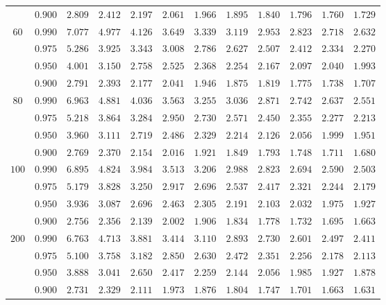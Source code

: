 \documentclass[11pt]{article}
\theoremstyle{definition}
\begin{document}
\begin{table}[H]
\begin{tabularx}{\linewidth}{c | c | c c c c c c c c c c}
		& $0.900$ & $2.809$ & $2.412$ & $2.197$ & $2.061$ & $1.966$ & $1.895$ & $1.840$ & $1.796$ & $1.760$ & $1.729$ \\
		$60$ & $0.990$ & $7.077$ & $4.977$ & $4.126$ & $3.649$ & $3.339$ & $3.119$ & $2.953$ & $2.823$ & $2.718$ & $2.632$ \\
		& $0.975$ & $5.286$ & $3.925$ & $3.343$ & $3.008$ & $2.786$ & $2.627$ & $2.507$ & $2.412$ & $2.334$ & $2.270$ \\
		& $0.950$ & $4.001$ & $3.150$ & $2.758$ & $2.525$ & $2.368$ & $2.254$ & $2.167$ & $2.097$ & $2.040$ & $1.993$ \\
		& $0.900$ & $2.791$ & $2.393$ & $2.177$ & $2.041$ & $1.946$ & $1.875$ & $1.819$ & $1.775$ & $1.738$ & $1.707$ \\
		$80$ & $0.990$ & $6.963$ & $4.881$ & $4.036$ & $3.563$ & $3.255$ & $3.036$ & $2.871$ & $2.742$ & $2.637$ & $2.551$ \\
		& $0.975$ & $5.218$ & $3.864$ & $3.284$ & $2.950$ & $2.730$ & $2.571$ & $2.450$ & $2.355$ & $2.277$ & $2.213$ \\
		& $0.950$ & $3.960$ & $3.111$ & $2.719$ & $2.486$ & $2.329$ & $2.214$ & $2.126$ & $2.056$ & $1.999$ & $1.951$ \\
		& $0.900$ & $2.769$ & $2.370$ & $2.154$ & $2.016$ & $1.921$ & $1.849$ & $1.793$ & $1.748$ & $1.711$ & $1.680$ \\
		$100$ & $0.990$ & $6.895$ & $4.824$ & $3.984$ & $3.513$ & $3.206$ & $2.988$ & $2.823$ & $2.694$ & $2.590$ & $2.503$ \\
		& $0.975$ & $5.179$ & $3.828$ & $3.250$ & $2.917$ & $2.696$ & $2.537$ & $2.417$ & $2.321$ & $2.244$ & $2.179$ \\
		& $0.950$ & $3.936$ & $3.087$ & $2.696$ & $2.463$ & $2.305$ & $2.191$ & $2.103$ & $2.032$ & $1.975$ & $1.927$ \\
		& $0.900$ & $2.756$ & $2.356$ & $2.139$ & $2.002$ & $1.906$ & $1.834$ & $1.778$ & $1.732$ & $1.695$ & $1.663$ \\
		$200$ & $0.990$ & $6.763$ & $4.713$ & $3.881$ & $3.414$ & $3.110$ & $2.893$ & $2.730$ & $2.601$ & $2.497$ & $2.411$ \\
		& $0.975$ & $5.100$ & $3.758$ & $3.182$ & $2.850$ & $2.630$ & $2.472$ & $2.351$ & $2.256$ & $2.178$ & $2.113$ \\
		& $0.950$ & $3.888$ & $3.041$ & $2.650$ & $2.417$ & $2.259$ & $2.144$ & $2.056$ & $1.985$ & $1.927$ & $1.878$ \\
		& $0.900$ & $2.731$ & $2.329$ & $2.111$ & $1.973$ & $1.876$ & $1.804$ & $1.747$ & $1.701$ & $1.663$ & $1.631$ \\

\end{tabularx}
\end{table}
\end{document}
